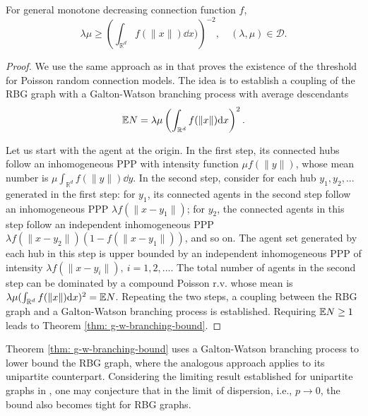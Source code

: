 \begin{theorem}
    For general monotone decreasing connection function $f$, 
    \begin{equation}    
    \lambda\mu\geq \left(\int_{\mathbb{R}^d}f(\|x\|) \dd x)\right)^{-2},\quad (\lambda,\mu)\in\mathcal{D}.
    \label{eq: g-w-branching-bound}
    \end{equation}
    \label{thm: g-w-branching-bound}
\end{theorem}
\begin{proof}
    We use the same approach as in \cite[Chapter 6]{MeesterRonald1996CP} that proves the existence of the threshold for Poisson random connection models. The idea is to establish a coupling of the RBG graph with a Galton-Watson branching process with average descendants \[\mathbb{E} N=\lambda\mu\left(\int_{\mathbb{R}^d}f(\|x\|) \mathrm{d} x\right)^2.\]

    Let us start with the agent at the origin. In the first step, its connected hubs follow an inhomogeneous PPP with intensity function $\mu f(\|y\|)$, whose mean number is $\mu\int_{\mathbb{R}^d}f(\|y\|) \dd y$. In the second step, consider for each hub $y_1, y_2,...$ generated in the first step: for $y_1$, its connected agents in the second step  follow an inhomogeneous PPP  $\lambda f(\|x-y_1\|)$; for $y_2$, the connected agents in this step  follow an independent inhomogeneous PPP $\lambda f(\|x-y_2\|)(1-f(\|x-y_1\|))$, and so on. The agent set generated by each hub in this step is upper bounded by an independent inhomogeneous PPP of intensity $\lambda f(\|x-y_i\|),~i=1,2,...$. The total number of agents in the second step can be dominated by a compound Poisson r.v. whose mean is $\lambda\mu(\int_{\mathbb{R}^d}f(\|x\|) \mathrm{d} x)^2 = \mathbb{E} N$. Repeating the two steps, a coupling between the RBG graph and a Galton-Watson branching process is established. Requiring $\mathbb{E} N \geq 1$ leads to Theorem \ref{thm: g-w-branching-bound}. 
\end{proof}

Theorem \ref{thm: g-w-branching-bound} uses a Galton-Watson branching process to lower bound the RBG graph, where the analogous approach applies to its unipartite counterpart. Considering the limiting result established for unipartite graphs in \cite{penrose1993spread}, one may conjecture that in the limit of dispersion, i.e., $p\to0$, the bound also becomes tight for RBG graphs. 

